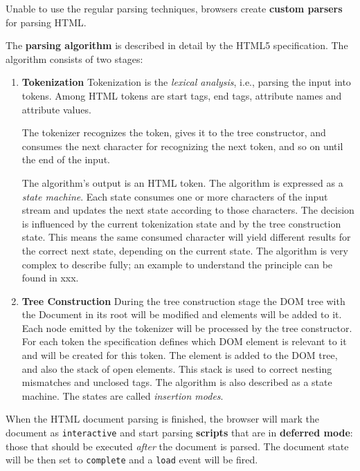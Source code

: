 \documentclass[a4paper, justified, notoc]{tufte-handout} %
\begin{document}
Unable to use the regular parsing techniques, browsers create \textbf{custom parsers} for parsing HTML.

The \textbf{parsing algorithm} is described in detail by the HTML5 specification. The algorithm consists of two stages: \begin{enumerate}
	\item \textbf{Tokenization} \newline 
		Tokenization is the \emph{lexical analysis}, i.e., parsing the input into tokens. Among HTML tokens are start tags, end tags, attribute names and attribute values.

The tokenizer recognizes the token, gives it to the tree constructor, and consumes the next character for recognizing the next token, and so on until the end of the input.

The algorithm's output is an HTML token. The algorithm is expressed as a \emph{state machine}. Each state consumes one or more characters of the input stream and updates the next state according to those characters. The decision is influenced by the current tokenization state and by the tree construction state. This means the same consumed character will yield different results for the correct next state, depending on the current state. The algorithm is very complex to describe fully; an example to understand the principle can be found in xxx.

	\item \textbf{Tree Construction} \newline
	During the tree construction stage the DOM tree with the Document in its root will be modified and elements will be added to it. Each node emitted by the tokenizer will be processed by the tree constructor. For each token the specification defines which DOM element is relevant to it and will be created for this token. The element is added to the DOM tree, and also the stack of open elements. This stack is used to correct nesting mismatches and unclosed tags. The algorithm is also described as a state machine. The states are called \emph{insertion modes}.
\end{enumerate} 

When the HTML document parsing is finished, the browser will mark the document as \texttt{interactive} and start parsing \textbf{scripts} that are in \textbf{deferred mode}: those that should be executed \emph{after} the document is parsed. The document state will be then set to \texttt{complete} and a \texttt{load} event will be fired.
\end{document}
